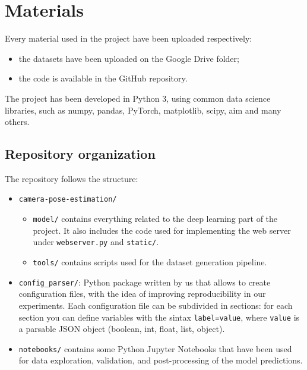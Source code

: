 \section{Materials}
Every material used in the project have been uploaded respectively:
\begin{itemize}
    \item the datasets have been uploaded on the Google Drive folder;
    \item the code is available in the GitHub repository.
\end{itemize}

The project has been developed in Python 3, using common data science libraries, such as numpy, pandas, PyTorch, matplotlib, scipy, aim and many others.

\subsection{Repository organization}
The repository follows the structure:
\begin{itemize}
    \item \texttt{camera-pose-estimation/}
    \begin{itemize}
        \item \texttt{model/} contains everything related to the deep learning part of the project. It also includes the code used for implementing the web server under \texttt{webserver.py} and \texttt{static/}.
        \item \texttt{tools/} contains scripts used for the dataset generation pipeline.
    \end{itemize}
    \item \texttt{config\_parser/}: Python package written by us that allows to create configuration files, with the idea of improving reproducibility in our experiments. Each configuration file can be subdivided in sections: for each section you can define variables with the sintax \texttt{label=value}, where \texttt{value} is a parsable JSON object (boolean, int, float, list, object).
    \item \texttt{notebooks/} contains some Python Jupyter Notebooks that have been used for data exploration, validation, and post-processing of the model predictions.
\end{itemize}

